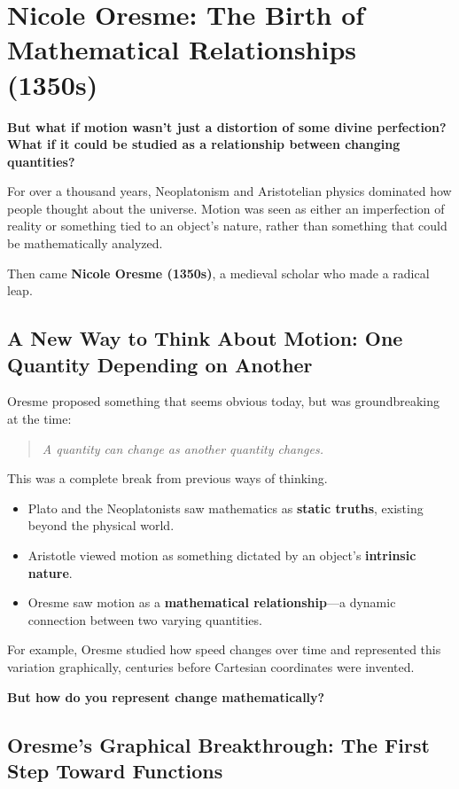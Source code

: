\section{Nicole Oresme: The Birth of Mathematical Relationships (1350s)}

\textbf{But what if motion wasn’t just a distortion of some divine perfection? What if it could be studied as a relationship between changing quantities?}

For over a thousand years, Neoplatonism and Aristotelian physics dominated how people thought about the universe. Motion was seen as either an imperfection of reality or something tied to an object’s nature, rather than something that could be mathematically analyzed.

Then came \textbf{Nicole Oresme (1350s)}, a medieval scholar who made a radical leap.

\subsection{A New Way to Think About Motion: One Quantity Depending on Another}

Oresme proposed something that seems obvious today, but was groundbreaking at the time:

\begin{quote}
\textit{A quantity can change as another quantity changes.}
\end{quote}

This was a complete break from previous ways of thinking.

\begin{itemize}
    \item Plato and the Neoplatonists saw mathematics as \textbf{static truths}, existing beyond the physical world.
    \item Aristotle viewed motion as something dictated by an object’s \textbf{intrinsic nature}.
    \item Oresme saw motion as a \textbf{mathematical relationship}—a dynamic connection between two varying quantities.
\end{itemize}

For example, Oresme studied how speed changes over time and represented this variation graphically, centuries before Cartesian coordinates were invented.

\textbf{But how do you represent change mathematically?}

\subsection{Oresme’s Graphical Breakthrough: The First Step Toward Functions}

